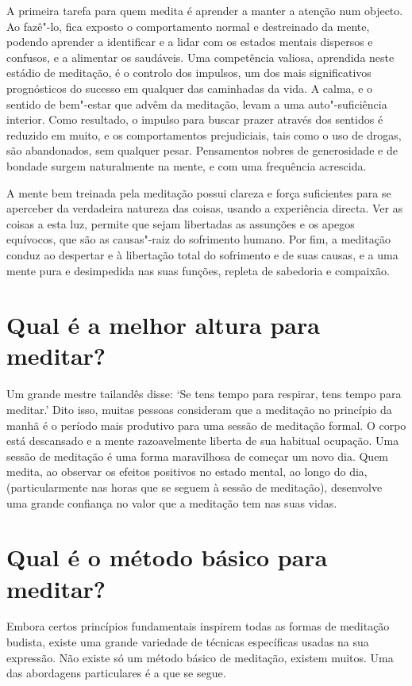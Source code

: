 A primeira tarefa para quem medita é aprender a manter a atenção num
objecto. Ao fazê"-lo, fica exposto o comportamento normal e destreinado
da mente, podendo aprender a identificar e a lidar com os estados
mentais dispersos e confusos, e a alimentar os saudáveis. Uma
competência valiosa, aprendida neste estádio de meditação, é o controlo
dos impulsos, um dos mais significativos prognósticos do sucesso em
qualquer das caminhadas da vida. A calma, e o sentido de bem"-estar que
advêm da meditação, levam a uma auto"-suficiência interior. Como
resultado, o impulso para buscar prazer através dos sentidos é reduzido
em muito, e os comportamentos prejudiciais, tais como o uso de drogas,
são abandonados, sem qualquer pesar. Pensamentos nobres de generosidade
e de bondade surgem naturalmente na mente, e com uma frequência
acrescida.

A mente bem treinada pela meditação possui clareza e força suficientes
para se aperceber da verdadeira natureza das coisas, usando a
experiência directa. Ver as coisas a esta luz, permite que sejam
libertadas as assunções e os apegos equívocos, que são as causas"-raiz do
sofrimento humano. Por fim, a meditação conduz ao despertar e à
libertação total do sofrimento e de suas causas, e a uma mente pura e
desimpedida nas suas funções, repleta de sabedoria e compaixão.

\section{Qual é a melhor altura para meditar?}

Um grande mestre tailandês disse: `Se tens tempo para respirar, tens
tempo para meditar.' Dito isso, muitas pessoas consideram que a
meditação no princípio da manhã é o período mais produtivo para uma
sessão de meditação formal. O corpo está descansado e a mente
razoavelmente liberta de sua habitual ocupação. Uma sessão de meditação
é uma forma maravilhosa de começar um novo dia. Quem medita, ao observar
os efeitos positivos no estado mental, ao longo do dia, (particularmente
nas horas que se seguem à sessão de meditação), desenvolve uma grande
confiança no valor que a meditação tem nas suas vidas.

\section{Qual é o método básico para meditar?}

Embora certos princípios fundamentais inspirem todas as formas de
meditação budista, existe uma grande variedade de técnicas específicas
usadas na sua expressão. Não existe só um método básico de meditação,
existem muitos. Uma das abordagens particulares é a que se segue.

